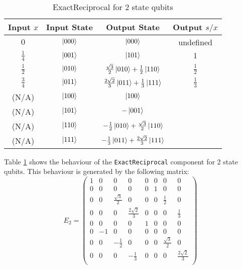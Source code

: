 \documentclass[12pt]{extarticle}
\begin{document}
\begin{table}[h!]
\centering
\begin{tabular}{|c|c|c|c|}
\hline
Input $x$     & Input State  & Output State                                              & Output $s/x$  \\
\hline
$0$           &  $\ket{000}$ &  $\ket{000}$                                              & undefined     \\
$\frac{1}{4}$ &  $\ket{001}$ &  $\ket{101}$                                              & $1$           \\
$\frac{1}{2}$ &  $\ket{010}$ & $\frac{\sqrt{3}}{2} \ket{010} + \frac{1}{2} \ket{110}$    & $\frac{1}{2}$ \\
$\frac{3}{4}$ &  $\ket{011}$ & $\frac{2 \sqrt{2}}{3} \ket{011} + \frac{1}{3} \ket{111}$  & $\frac{1}{3}$ \\
(N/A)         &  $\ket{100}$ & $\ket{100}$                                               & \\
(N/A)         &  $\ket{101}$ & $-\ket{001}$                                              & \\
(N/A)         &  $\ket{110}$ & $-\frac{1}{2} \ket{010} + \frac{\sqrt{3}}{2} \ket{110}$   & \\
(N/A)         &  $\ket{111}$ & $-\frac{1}{3} \ket{011} + \frac{2 \sqrt{2}}{3} \ket{111}$ & \\
\hline
\end{tabular}
\caption{ExactReciprocal for 2 state qubits}
\label{tab:exactreciprocal2}
\end{table}

Table \ref{tab:exactreciprocal2} shows the behaviour of the \texttt{ExactReciprocal} component for 2 state qubits.
This behaviour is generated by the following matrix:
\[
E_2 = \begin{pmatrix}
1 &  0 & 0                  & 0                   & 0 & 0 & 0                  & 0 \\
0 &  0 & 0                  & 0                   & 0 & 1 & 0                  & 0 \\
0 &  0 & \frac{\sqrt{3}}{2} & 0                   & 0 & 0 & \frac{1}{2}        & 0 \\
0 &  0 & 0                  & \frac{2\sqrt{2}}{3} & 0 & 0 & 0                  & \frac{1}{3} \\
0 &  0 & 0                  & 0                   & 1 & 0 & 0                  & 0 \\
0 & -1 & 0                  & 0                   & 0 & 0 & 0                  & 0 \\
0 &  0 & -\frac{1}{2}       & 0                   & 0 & 0 & \frac{\sqrt{3}}{2} & 0 \\
0 &  0 & 0                  & -\frac{1}{3}        & 0 & 0 & 0                  & \frac{2\sqrt{2}}{3} \\
\end{pmatrix}
\]
\end{document}
